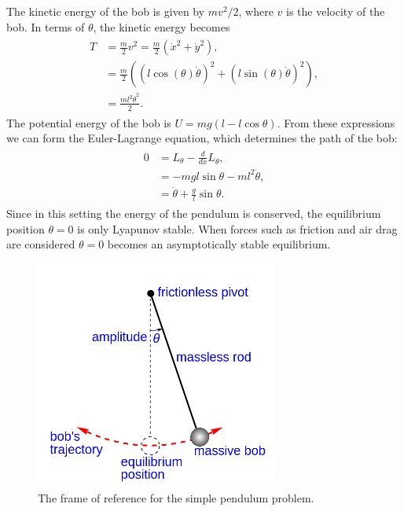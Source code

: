 The kinetic energy of the bob is given by $mv^2/2$, where $v$ is the velocity of the bob. 
In terms of $\theta$, the kinetic energy becomes 
\begin{align}
	\begin{split}
	T &= \frac{m}{2}v^2  = \frac{m}{2}(\dot{x}^2 + \dot{y}^2),\\
	&= \frac{m}{2}((l\cos(\theta)\dot{\theta})^2 + (l\sin(\theta)\dot{\theta})^2),\\
	&= \frac{ml^2\dot{\theta}^2}{2}.
	\end{split}
\end{align}
The potential energy of the bob is $U = mg(l-l\cos \theta)$. 
From these expressions we can form the Euler-Lagrange equation, which determines the path of the bob: 
\begin{align}
	\begin{split}
	0 &= L_{\theta} - \frac{d}{dx}L_{\dot{\theta}},\\
	&= -mgl\sin \theta - m l^2 \ddot{\theta},\\
	&= \ddot{\theta} + \frac{g}{l}\sin \theta.
	\end{split}
\end{align}
Since in this setting the energy of the pendulum is conserved, the equilibrium position $\theta = 0$ is only Lyapunov stable. When forces such as friction and air drag are considered $\theta = 0$ becomes an asymptotically stable equilibrium. 

\begin{figure}
\centering
\includegraphics[width=8cm]{Simple_gravity_pendulum.png}
\caption{The frame of reference for the simple pendulum problem.
}
\label{fig:inverted_pendulum:simple_gravity_pendulum}
\end{figure}


